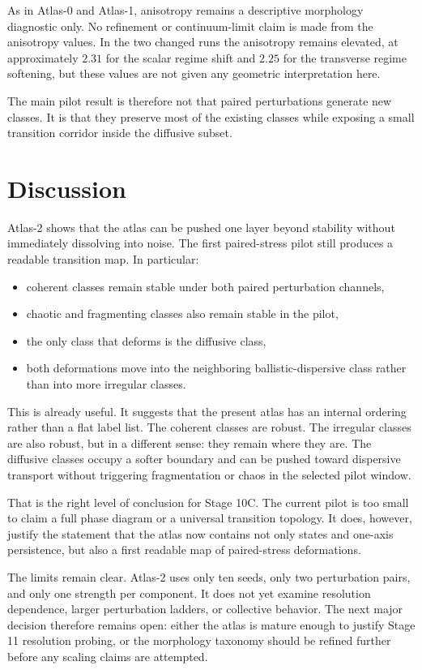 \documentclass[11pt]{article}
\begin{document}
As in Atlas-0 and Atlas-1, anisotropy remains a descriptive morphology diagnostic only. No refinement or continuum-limit claim is made from the anisotropy values. In the two changed runs the anisotropy remains elevated, at approximately $2.31$ for the scalar regime shift and $2.25$ for the transverse regime softening, but these values are not given any geometric interpretation here.

The main pilot result is therefore not that paired perturbations generate new classes. It is that they preserve most of the existing classes while exposing a small transition corridor inside the diffusive subset.

\section{Discussion}
Atlas-2 shows that the atlas can be pushed one layer beyond stability without immediately dissolving into noise. The first paired-stress pilot still produces a readable transition map. In particular:
\begin{itemize}
\item coherent classes remain stable under both paired perturbation channels,
\item chaotic and fragmenting classes also remain stable in the pilot,
\item the only class that deforms is the diffusive class,
\item both deformations move into the neighboring ballistic-dispersive class rather than into more irregular classes.
\end{itemize}

This is already useful. It suggests that the present atlas has an internal ordering rather than a flat label list. The coherent classes are robust. The irregular classes are also robust, but in a different sense: they remain where they are. The diffusive classes occupy a softer boundary and can be pushed toward dispersive transport without triggering fragmentation or chaos in the selected pilot window.

That is the right level of conclusion for Stage 10C. The current pilot is too small to claim a full phase diagram or a universal transition topology. It does, however, justify the statement that the atlas now contains not only states and one-axis persistence, but also a first readable map of paired-stress deformations.

The limits remain clear. Atlas-2 uses only ten seeds, only two perturbation pairs, and only one strength per component. It does not yet examine resolution dependence, larger perturbation ladders, or collective behavior. The next major decision therefore remains open: either the atlas is mature enough to justify Stage 11 resolution probing, or the morphology taxonomy should be refined further before any scaling claims are attempted.
\end{document}
